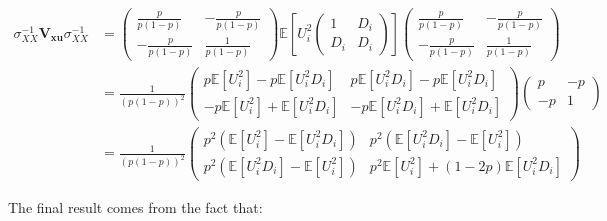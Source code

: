 \documentclass[]{book}
\newcommand{\esp}[1]{\mathbb{E}[ #1 ]}
\theoremstyle{definition}
\theoremstyle{definition}
\theoremstyle{definition}
\theoremstyle{remark}
\begin{document}
\begin{align*}
\sigma_{XX}^{-1}\mathbf{V_{xu}}\sigma_{XX}^{-1} 
                  & = \left(\begin{array}{cc}  
                                          \frac{p}{p(1-p)} & -\frac{p}{p(1-p)}\\
                                          -\frac{p}{p(1-p)} & \frac{1}{p(1-p)} 
                          \end{array}\right)
                          \esp{U_i^2\left(\begin{array}{cc}  1 & D_i\\  D_i & D_i\end{array}\right)}        
                          \left(\begin{array}{cc}  
                                          \frac{p}{p(1-p)} & -\frac{p}{p(1-p)}\\
                                          -\frac{p}{p(1-p)} & \frac{1}{p(1-p)} 
                          \end{array}\right)\\
                  & = \frac{1}{(p(1-p))^2}
                          \left(\begin{array}{cc}  
                                          p\esp{U_i^2}-p\esp{U_i^2D_i} & p\esp{U_i^2D_i}-p\esp{U_i^2D_i}\\
                                          -p\esp{U_i^2}+\esp{U_i^2D_i} &  -p\esp{U_i^2D_i}+\esp{U_i^2D_i}
                          \end{array}\right)
                         \left(\begin{array}{cc}  
                                          p & -p\\
                                          -p & 1 
                          \end{array}\right)\\
                 & = \frac{1}{(p(1-p))^2}
                          \left(\begin{array}{cc}  
                                          p^2(\esp{U_i^2}-\esp{U_i^2D_i}) & p^2(\esp{U_i^2D_i}-\esp{U_i^2})\\
                                          p^2(\esp{U_i^2D_i}-\esp{U_i^2}) &  p^2\esp{U_i^2}+(1-2p)\esp{U_i^2D_i}
                          \end{array}\right)
 \end{align*}

The final result comes from the fact that:
\end{document}
